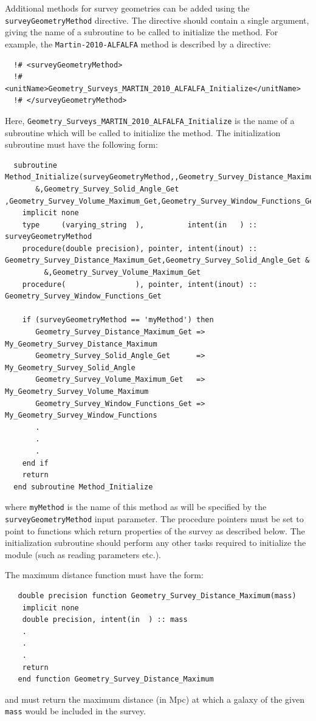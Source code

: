Additional methods for survey geometries can be added using the {\tt surveyGeometryMethod} directive. The directive should contain a single argument, giving the name of a subroutine to be called to initialize the method. For example, the {\tt Martin-2010-ALFALFA} method is described by a directive:
\begin{verbatim}
  !# <surveyGeometryMethod>
  !#  <unitName>Geometry_Surveys_MARTIN_2010_ALFALFA_Initialize</unitName>
  !# </surveyGeometryMethod>
\end{verbatim}
Here, {\tt Geometry\_Surveys\_MARTIN\_2010\_ALFALFA\_Initialize} is the name of a subroutine which will be called to initialize the method. The initialization subroutine must have the following form:
\begin{verbatim}
  subroutine Method_Initialize(surveyGeometryMethod,,Geometry_Survey_Distance_Maximum_Get&
       &,Geometry_Survey_Solid_Angle_Get ,Geometry_Survey_Volume_Maximum_Get,Geometry_Survey_Window_Functions_Get)
    implicit none
    type     (varying_string  ),          intent(in   ) :: surveyGeometryMethod
    procedure(double precision), pointer, intent(inout) :: Geometry_Survey_Distance_Maximum_Get,Geometry_Survey_Solid_Angle_Get &
         &,Geometry_Survey_Volume_Maximum_Get
    procedure(                ), pointer, intent(inout) :: Geometry_Survey_Window_Functions_Get

    if (surveyGeometryMethod == 'myMethod') then
       Geometry_Survey_Distance_Maximum_Get => My_Geometry_Survey_Distance_Maximum
       Geometry_Survey_Solid_Angle_Get      => My_Geometry_Survey_Solid_Angle
       Geometry_Survey_Volume_Maximum_Get   => My_Geometry_Survey_Volume_Maximum
       Geometry_Survey_Window_Functions_Get => My_Geometry_Survey_Window_Functions
       .
       .
       .
    end if
    return
  end subroutine Method_Initialize
\end{verbatim}
where {\tt myMethod} is the name of this method as will be specified by the {\tt surveyGeometryMethod} input parameter. The procedure pointers  must be set to point to functions which return properties of the survey as described below. The initialization subroutine should perform any other tasks required to initialize the module (such as reading parameters etc.).

The maximum distance function must have the form:
\begin{verbatim}
   double precision function Geometry_Survey_Distance_Maximum(mass)
    implicit none
    double precision, intent(in  ) :: mass
    .
    .
    .
    return
   end function Geometry_Survey_Distance_Maximum 
\end{verbatim}
and must return the maximum distance (in Mpc) at which a galaxy of the given {\tt mass} would be included in the survey.

